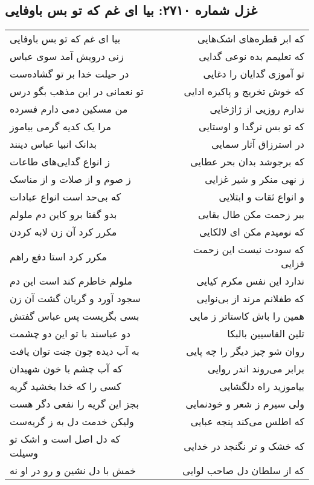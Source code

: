 \begin{center}
\section*{غزل شماره ۲۷۱۰: بیا ای غم که تو بس باوفایی}
\label{sec:2710}
\begin{longtable}{l p{0.5cm} r}
بیا ای غم که تو بس باوفایی
&&
که ابر قطره‌های اشک‌هایی
\\
زنی درویش آمد سوی عباس
&&
که تعلیمم بده نوعی گدایی
\\
در حیلت خدا بر تو گشاده‌ست
&&
تو آموزی گدایان را دغایی
\\
تو نعمانی در این مذهب بگو درس
&&
که خوش تخریج و پاکیزه ادایی
\\
من مسکین دمی دارم فسرده
&&
ندارم روزیی از ژاژخایی
\\
مرا یک کدیه گرمی بیاموز
&&
که تو بس نرگدا و اوستایی
\\
بدانک انبیا عباس دینند
&&
در استرزاق آثار سمایی
\\
ز انواع گدایی‌های طاعات
&&
که برجوشد بدان بحر عطایی
\\
ز صوم و از صلات و از مناسک
&&
ز نهی منکر و شیر غزایی
\\
که بی‌حد است انواع عبادات
&&
و انواع ثقات و ابتلایی
\\
بدو گفتا برو کاین دم ملولم
&&
ببر زحمت مکن طال بقایی
\\
مکرر کرد آن زن لابه کردن
&&
که نومیدم مکن ای لالکایی
\\
مکرر کرد استا دفع راهم
&&
که سودت نیست این زحمت فزایی
\\
ملولم خاطرم کند است این دم
&&
ندارد این نفس مکرم کیایی
\\
سجود آورد و گریان گشت آن زن
&&
که طفلانم مرند از بی‌نوایی
\\
بسی بگریست پس عباس گفتش
&&
همین را باش کاستاتر ز مایی
\\
دو عباسند با تو این دو چشمت
&&
تلین القاسیین بالبکا
\\
به آب دیده چون جنت توان یافت
&&
روان شو چیز دیگر را چه پایی
\\
که آب چشم با خون شهیدان
&&
برابر می‌روند اندر روایی
\\
کسی را که خدا بخشید گریه
&&
بیاموزید راه دلگشایی
\\
بجز این گریه را نفعی دگر هست
&&
ولی سیرم ز شعر و خودنمایی
\\
ولیکن خدمت دل به ز گریه‌ست
&&
که اطلس می‌کند پنجه عبایی
\\
که دل اصل است و اشک تو وسیلت
&&
که خشک و تر نگنجد در خدایی
\\
خمش با دل نشین و رو در او نه
&&
که از سلطان دل صاحب لوایی
\\
\end{longtable}
\end{center}
